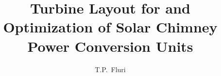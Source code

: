\documentclass[14pt,a4paper, afrikaans,english,PhD,goldenblock]{stb-thesis-x}
\title{\bfseries Turbine Layout for and Optimization of Solar Chimney Power Conversion Units}
\author{T.P.\ Fluri}{Thomas Peter Fluri}
\begin{document}
\frontmatter 
\TitlePage
\end{document}
